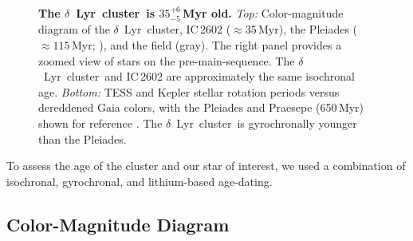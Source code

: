 \documentclass[12pt,modern,twocolumn,tighten]{aastex63}
\newcommand{\cn}{$\delta$\ Lyr\ cluster} %
\begin{document}
\begin{figure}[tp]
\begin{center}
		\vspace{-0.5cm}
	\end{center}
	\vspace{-0.7cm}
	\caption{
    {\bf The \cn\ is $35^{+6}_{-5}$\,Myr old.}  {\it Top:}
    Color-magnitude diagram of the \cn, IC\,2602 ($\approx35$\,Myr),
    the Pleiades ($\approx 115$\,Myr; \citealt{dahm_2015}), and the
    field (gray).  The right panel provides a zoomed
    view of stars on the pre-main-sequence.  The \cn\ and IC\,2602 are
    approximately the same isochronal age.  {\it Bottom:} TESS and
    Kepler stellar rotation periods versus dereddened Gaia colors, with
    the Pleiades and Praesepe (650\,Myr) shown for
    reference \citep{rebull_rotation_2016a,douglas_poking_2017}.
    The \cn\ is gyrochronally younger than the Pleiades.
   \label{fig:age}
	}
\end{figure}

To assess the age of the cluster and our star of interest, we used a
combination of isochronal, gyrochronal, and lithium-based
age-dating.

\subsection{Color-Magnitude Diagram}
\label{sec:cmd}
\end{document}
